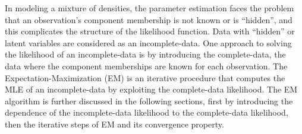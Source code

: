 

    

In modeling a mixture of densities, the parameter estimation faces the problem that an observation's component membership is not known or is ``hidden'', and this complicates the structure of the likelihood function. Data with ``hidden'' or latent variables are considered as an incomplete-data. One approach to solving the likelihood of an incomplete-data is by introducing the complete-data, the data where the component memberships are known for each observation. The Expectation-Maximization (EM) is an iterative procedure that computes the MLE of an incomplete-data by exploiting the complete-data likelihood. The EM algorithm is further discussed in the following sections, first by introducing the dependence of the incomplete-data likelihood to the complete-data likelihood, then the iterative steps of EM and its convergence property.


